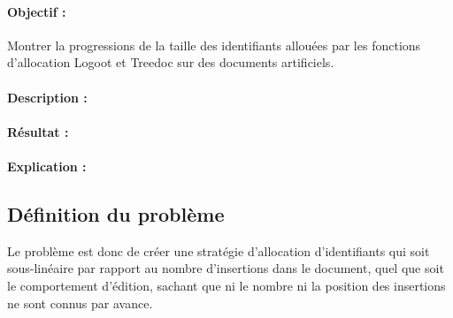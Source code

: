 \paragraph{Objectif :} Montrer la progressions de la taille des identifiants
allouées par les fonctions d'allocation Logoot et Treedoc sur des documents
artificiels.

\paragraph{Description :}

\paragraph{Résultat :}

\paragraph{Explication :}

\subsection{Définition du problème}


Le problème est donc de créer une stratégie d'allocation d'identifiants qui soit
sous-linéaire par rapport au nombre d'insertions dans le document, quel que soit
le comportement d'édition, sachant que ni le nombre ni la position des
insertions ne sont connus par avance. 

